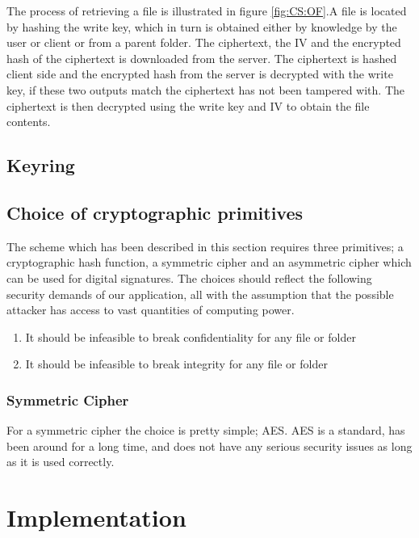 \documentclass[pdftex,english,10pt,b5paper,twoside]{book}
\begin{document}
The process of retrieving a file is illustrated in figure \ref{fig:CS:OF}.A
file is located by hashing the write key, which in turn is obtained either by
knowledge by the user or client or from a parent folder. The ciphertext, the
\ac{IV} and the encrypted hash of the ciphertext is downloaded from the server.
The ciphertext is hashed client side and the encrypted hash from the server is
decrypted with the write key, if these two outputs match the ciphertext has not
been tampered with. The ciphertext is then decrypted using the write key and
\ac{IV} to obtain the file contents.

\section{Keyring}


\section{Choice of cryptographic primitives}
The scheme which has been described in this section requires three primitives;
a cryptographic hash function, a symmetric cipher and an asymmetric cipher
which can be used for digital signatures. The choices should reflect the
following security demands of our application, all with the assumption that the
possible attacker has access to vast quantities of computing power.

\begin{enumerate}
    \item It should be infeasible to break confidentiality for any file or folder
    \item It should be infeasible to break integrity for any file or folder
\end{enumerate}

\subsection{Symmetric Cipher}
For a symmetric cipher the choice is pretty simple; \ac{AES}. \ac{AES} is
a standard, has been around for a long time, and does not have any serious
security issues as long as it is used correctly.

\chapter{Implementation}
\end{document}
